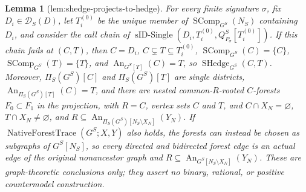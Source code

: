 \documentclass{article}
\newtheorem{lemma}{Lemma}
\begin{document}
\begin{lemma}[lem:shedge-projects-to-hedge]\label{lem:shedge-projects-to-hedge}
For every finite signature \(\sigma\), fix \(D_i\in\mathcal D_S(D)\), let \(T_i^{(0)}\) be the unique member of \(\operatorname{SComp}_{G^S}(N_S)\) containing \(D_i\), and consider the call chain of \(\operatorname{sID\text{-}Single}(D_i,T_i^{(0)},Q_{P_\sigma}^S[T_i^{(0)}])\). If this chain fails at \((C,T)\), then \(C=D_i\), \(C\subsetneq T\subseteq T_i^{(0)}\), \(\operatorname{SComp}_{G^S}(C)=\{C\}\), \(\operatorname{SComp}_{G^S}(T)=\{T\}\), and \(\operatorname{An}_{G^S[T]}(C)=T\), so \(\operatorname{SHedge}_{G^S}(C,T)\). Moreover, \(\Pi_S(G^S)[C]\) and \(\Pi_S(G^S)[T]\) are single districts, \(\operatorname{An}_{\Pi_S(G^S)[T]}(C)=T\), and there are nested common-\(R\)-rooted \(C\)-forests \(F_0\subset F_1\) in the projection, with \(R=C\), vertex sets \(C\) and \(T\), and \(C\cap X_N=\varnothing\), \(T\cap X_N\ne\varnothing\), and \(R\subseteq\operatorname{An}_{\Pi_S(G^S)[N_S\setminus X_N]}(Y_N)\). If \(\operatorname{NativeForestTrace}(G^S;X,Y)\) also holds, the forests can instead be chosen as subgraphs of \(G^S[N_S]\), so every directed and bidirected forest edge is an actual edge of the original nonancestor graph and \(R\subseteq\operatorname{An}_{G^S[N_S\setminus X_N]}(Y_N)\). These are graph-theoretic conclusions only; they assert no binary, rational, or positive countermodel construction.
\end{lemma}
\end{document}
